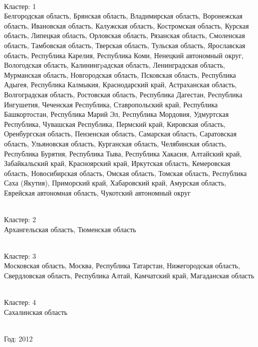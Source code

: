 \documentclass[11pt]{article}
\begin{document}
\newline \\ Кластер:  1
\\ Белгородская область, Брянская область, Владимирская область, Воронежская область, Ивановская область, Калужская область, Костромская область, Курская область, Липецкая область, Орловская область, Рязанская область, Смоленская область, Тамбовская область, Тверская область, Тульская область, Ярославская область, Республика Карелия, Республика Коми, Ненецкий автономный округ, Вологодская область, Калинингpадская область, Ленинградская область, Мурманская область, Новгородская область, Псковская область, Республика Адыгея, Республика Калмыкия, Краснодарский край, Астраханская область, Волгоградская область, Ростовская область, Республика Дагестан, Республика Ингушетия, Чеченская Республика, Ставропольский край, Республика Башкортостан, Республика Марий Эл, Республика Мордовия, Удмуртская Республика, Чувашская Республика, Пермский край, Кировская область, Оренбургская область, Пензенская область, Самарская область, Саратовская область, Ульяновская область, Курганская область, Челябинская область, Республика Бурятия, Республика Тыва, Республика Хакасия, Алтайский край, Забайкальский край, Красноярский край, Иркутская область, Кемеровская область, Новосибирская область, Омская область, Томская область, Республика Саха (Якутия), Приморский край, Хабаровский край, Амурская область, Еврейская автономная область, Чукотский автономный округ

\newline \\ Кластер:  2
\\ Архангельская область, Тюменская область

\newline \\ Кластер:  3
\\ Московская область, Москва, Республика Татарстан, Нижегородская область, Свердловская область, Республика Алтай, Камчатский край, Магаданская область

\newline \\ Кластер:  4
\\ Сахалинская область


\newline \newline \\ Год:  2012
\end{document}
